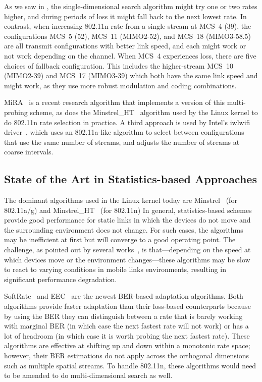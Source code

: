 As we saw in , the single-dimensional search algorithm might try one or two rates higher, and during periods of loss it might fall back to the next lowest rate. In contrast, when increasing 802.11n rate from a single stream at MCS~4 (39\Mbps), the configurations MCS~5 (52\Mbps), MCS~11 (MIMO2-52\Mbps), and MCS~18 (MIMO3-58.5\Mbps) are all transmit configurations with better link speed, and each might work or not work depending on the channel. When MCS~4 experiences loss, there are five choices of fallback configuration. This includes the higher-stream MCS~10 (MIMO2-39\Mbps) and MCS~17 (MIMO3-39\Mbps) which both have the same link speed and might work, as they use more robust modulation and coding combinations.

MiRA~\cite{Pefkianakis_MiRA} is a recent research algorithm that implements a version of this multi-probing scheme, as does the Minstrel\_HT~\cite{minstrel_ht} algorithm used by the Linux kernel to do 802.11n rate selection in practice. A third approach is used by Intel's iwlwifi driver~\cite{iwlwifi}, which uses an 802.11a-like algorithm to select between configurations that use the same number of streams, and adjusts the number of streams at coarse intervals.

\subsection{State of the Art in Statistics-based Approaches}
The dominant algorithms used in the Linux kernel today are Minstrel~\cite{minstrel} (for 802.11a/g) and Minstrel\_HT~\cite{minstrel_ht} (for 802.11n)  In general, statistics-based schemes provide good performance for static links in which the devices do not move and the surrounding environment does not change. For such cases, the algorithms may be inefficient at first but will converge to a good operating point. The challenge, as pointed out by several works~\cite{Holland_RBAR,Judd_CHARM,Vutukuru_SoftRate}, is that---depending on the speed at which devices move or the environment changes---these algorithms may be slow to react to varying conditions in mobile links environments, resulting in significant performance degradation.

SoftRate~\cite{Vutukuru_SoftRate} and EEC~\cite{Chen_EEC} are the newest BER-based adaptation algorithms. Both algorithms provide faster adaptation than their loss-based counterparts because by using the BER they can distinguish between a rate that is barely working with marginal BER (in which case the next fastest rate will not work) or has a lot of headroom (in which case it is worth probing the next fastest rate). These algorithms are effective at shifting up and down within a monotonic rate space; however, their BER estimations do not apply across the orthogonal dimensions such as multiple spatial streams. To handle 802.11n, these algorithms would need to be amended to do multi-dimensional search as well.

